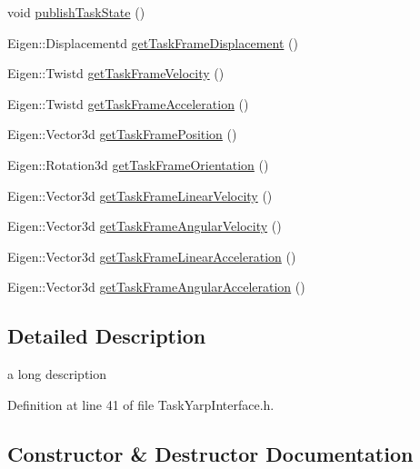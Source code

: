 \begin{DoxyCompactItemize}
\item 
void \hyperlink{classocra_1_1TaskYarpInterface_a758e222fe2e69f6932b13e275636e7be}{publish\+Task\+State} ()
\item 
Eigen\+::\+Displacementd \hyperlink{classocra_1_1TaskYarpInterface_aedcb64b913403fa8d5ba41be208732d1}{get\+Task\+Frame\+Displacement} ()
\item 
Eigen\+::\+Twistd \hyperlink{classocra_1_1TaskYarpInterface_a073e124334125ce712c194a5e6826038}{get\+Task\+Frame\+Velocity} ()
\item 
Eigen\+::\+Twistd \hyperlink{classocra_1_1TaskYarpInterface_a59a7442dac9b971d36ba792b05d2afba}{get\+Task\+Frame\+Acceleration} ()
\item 
Eigen\+::\+Vector3d \hyperlink{classocra_1_1TaskYarpInterface_a5bdab48cc56cd473f007bb6f1c9c739d}{get\+Task\+Frame\+Position} ()
\item 
Eigen\+::\+Rotation3d \hyperlink{classocra_1_1TaskYarpInterface_a9878b0030948a97cacbe6aef76846a48}{get\+Task\+Frame\+Orientation} ()
\item 
Eigen\+::\+Vector3d \hyperlink{classocra_1_1TaskYarpInterface_ab7773bffb7b1cb3fc9968108afa30665}{get\+Task\+Frame\+Linear\+Velocity} ()
\item 
Eigen\+::\+Vector3d \hyperlink{classocra_1_1TaskYarpInterface_adc74f01320a4326756d855b1e24e395f}{get\+Task\+Frame\+Angular\+Velocity} ()
\item 
Eigen\+::\+Vector3d \hyperlink{classocra_1_1TaskYarpInterface_a798dc2edfbffa9759353dcc0afe96fff}{get\+Task\+Frame\+Linear\+Acceleration} ()
\item 
Eigen\+::\+Vector3d \hyperlink{classocra_1_1TaskYarpInterface_a68eee445c141dec3251ab40a38314c81}{get\+Task\+Frame\+Angular\+Acceleration} ()
\end{DoxyCompactItemize}


\subsection{Detailed Description}
a long description 

Definition at line 41 of file Task\+Yarp\+Interface.\+h.



\subsection{Constructor \& Destructor Documentation}
\hypertarget{classocra_1_1TaskYarpInterface_a152f24acc269a21955f1649de712938b}{}\label{classocra_1_1TaskYarpInterface_a152f24acc269a21955f1649de712938b} 
